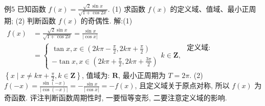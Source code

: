 例5 已知函数 $f(x)=\frac{\sqrt{2} \sin x}{\sqrt{1+\cos 2 x}}$.
(1) 求函数 $f(x)$ 的定义域、值域、最小正周期;
(2) 判断函数 $f(x)$ 的奇偶性.
解:(1) $\begin{aligned} f(x) & =\frac{\sqrt{2} \sin x}{\sqrt{1+\cos 2 x}}=\frac{\sin x}{|\cos x|} \\ & =\left\{\begin{array}{l}\tan x, x \in\left(2 k \pi-\frac{\pi}{2}, 2 k \pi+\frac{\pi}{2}\right) \\ -\tan x, x \in\left(2 k \pi+\frac{\pi}{2}, 2 k \pi+\frac{3 \pi}{2}\right)\end{array} k \in \mathbf{Z},\right.\end{aligned}$
定义域: $\left\{x \mid x \neq k \pi+\frac{\pi}{2}, k \in \mathbf{Z}\right\}$, 值域为: $\mathbf{R}$, 最小正周期为 $T=2 \pi$.
(2) $f(-x)=\frac{\sin (-x)}{|\cos (-x)|}=-\frac{\sin x}{|\cos x|}=-f(x)$, 且定义域关于原点对称, 所以 $f(x)$ 为奇函数.
评注判断函数周期性时, 一要恒等变形, 二要注意定义域的影响.



